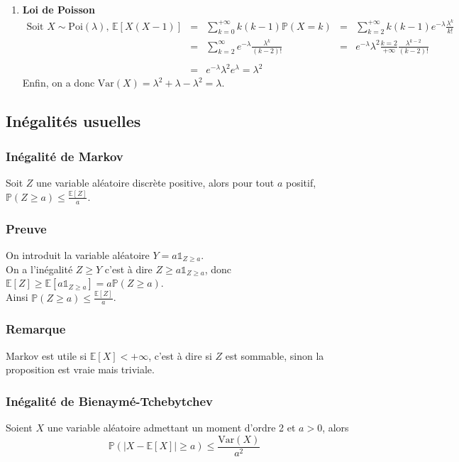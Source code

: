 \documentclass[a4paper,10pt]{book} %
\newcommand{\E}{\mathbb{E}} %
\renewcommand{\P}{\mathbb{P}} %
\newcommand\abs[1]{\left|#1\right|}
\newcommand{\Poi}{\mathrm{Poi}} %
\newcommand{\indi}{\mathds{1}} %
\newcommand{\Var}{\mathrm{Var}} %
\begin{document}
\begin{enumerate}
\item \textbf{Loi de Poisson}\\
$\begin{array}{rcccl}\text{Soit }X\sim\Poi(\lambda)\text{, } \E[X(X-1)]&=&\displaystyle \sum_{k=0}^{+\infty}k(k-1)\P(X=k) &=& \displaystyle  \sum_{k=2}^{+\infty}k(k-1)e^{-\lambda}\frac{\lambda^k}{k!}\\
&=&\displaystyle \sum_{k=2}^\infty e^{-\lambda}\frac{\lambda^k}{(k-2)!} &=& \displaystyle e^{-\lambda}\lambda^2\frac{k=2}{+\infty}\frac{\lambda^{k-2}}{(k-2)!}\\\\

&=&e^{-\lambda}\lambda^2e^\lambda=\lambda^2\end{array}$\\

Enfin, on a donc $\Var(X)=\lambda^2+\lambda-\lambda^2=\lambda$.
\end{enumerate}

\subsection{Inégalités usuelles}
\subsubsection{Inégalité de Markov}
Soit $Z$ une variable aléatoire discrète positive, alors pour tout $a$ positif, $\P(Z\geq a)\leq \frac{\E[Z]}{a}$.

\subsubsection{Preuve}
On introduit la variable aléatoire $Y = a \indi_{Z\geq a}$.\\

On a l'inégalité $Z\geq Y$ c'est à dire $Z\geq a\indi_{Z\geq a}$, donc $\E[Z]\geq \E[a\indi_{Z\geq a}]=a\P(Z\geq a)$.\\
Ainsi $\P(Z\geq a)\leq \frac{\E[Z]}{a}$.

\subsubsection{Remarque}
Markov est utile si $\E[X]<+\infty$, c'est à dire si $Z$ est sommable, sinon la proposition est vraie mais triviale.

\subsubsection{Inégalité de Bienaymé-Tchebytchev}
Soient $X$ une variable aléatoire admettant un moment d'ordre 2 et $a>0$, alors $$\P(\abs{X-\E[X]}\geq a)\leq \frac{\Var(X)}{a^2}$$
\end{document}
